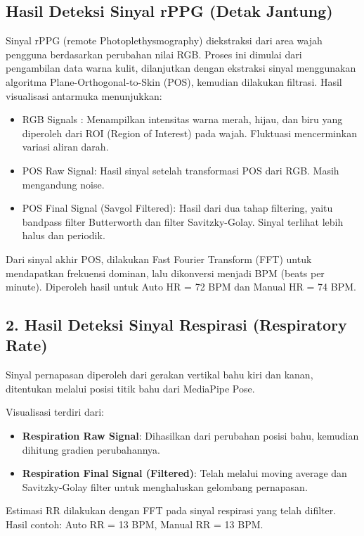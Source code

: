 \documentclass[11pt,a4paper]{article}
\begin{document}
\subsection{Hasil Deteksi Sinyal rPPG (Detak Jantung)}
    Sinyal rPPG (remote Photoplethysmography) diekstraksi dari area wajah pengguna berdasarkan perubahan nilai RGB. Proses ini dimulai dari pengambilan data warna kulit, dilanjutkan dengan ekstraksi sinyal menggunakan algoritma Plane-Orthogonal-to-Skin (POS), kemudian dilakukan filtrasi.
    Hasil visualisasi antarmuka menunjukkan:
    \begin{itemize}
    \item RGB Signals : Menampilkan intensitas warna merah, hijau, dan biru yang diperoleh dari ROI (Region of Interest) pada wajah. Fluktuasi mencerminkan variasi aliran darah.
    \item POS Raw Signal: Hasil sinyal setelah transformasi POS dari RGB. Masih mengandung noise.
    \item POS Final Signal (Savgol Filtered): Hasil dari dua tahap filtering, yaitu bandpass filter Butterworth dan filter Savitzky-Golay. Sinyal terlihat lebih halus dan periodik.
    \end{itemize}

Dari sinyal akhir POS, dilakukan Fast Fourier Transform (FFT) untuk mendapatkan frekuensi dominan, lalu dikonversi menjadi BPM (beats per minute). Diperoleh hasil untuk  Auto HR = 72 BPM dan Manual HR = 74 BPM.

\subsection{2. Hasil Deteksi Sinyal Respirasi (Respiratory Rate)}
Sinyal pernapasan diperoleh dari gerakan vertikal bahu kiri dan kanan, ditentukan melalui posisi titik bahu dari MediaPipe Pose.

Visualisasi terdiri dari:
\begin{itemize}
    \item \textbf{Respiration Raw Signal}: Dihasilkan dari perubahan posisi bahu, kemudian dihitung gradien perubahannya.
    \item \textbf{Respiration Final Signal (Filtered)}: Telah melalui moving average dan Savitzky-Golay filter untuk menghaluskan gelombang pernapasan.
\end{itemize}

Estimasi RR dilakukan dengan FFT pada sinyal respirasi yang telah difilter. Hasil contoh: Auto RR = 13 BPM, Manual RR = 13 BPM.
\end{document}
